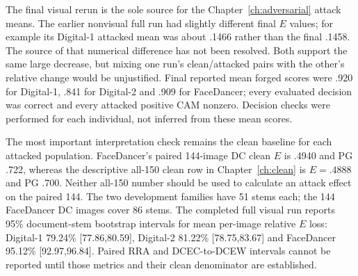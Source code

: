 The final visual rerun is the sole source for the Chapter~\ref{ch:adversarial} attack means. The earlier nonvisual full run had slightly different final $E$ values; for example its Digital-1 attacked mean was about .1466 rather than the final .1458. The source of that numerical difference has not been resolved. Both support the same large decrease, but mixing one run's clean/attacked pairs with the other's relative change would be unjustified. Final reported mean forged scores were .920 for Digital-1, .841 for Digital-2 and .909 for FaceDancer; every evaluated decision was correct and every attacked positive CAM nonzero. Decision checks were performed for each individual, not inferred from these mean scores.

The most important interpretation check remains the clean baseline for each attacked population. FaceDancer's paired 144-image DC clean $E$ is .4940 and PG .722, whereas the descriptive all-150 clean row in Chapter~\ref{ch:clean} is $E=.4888$ and PG .700. Neither all-150 number should be used to calculate an attack effect on the paired 144. The two development families have 51 stems each; the 144 FaceDancer DC images cover 86 stems. The completed full visual run reports 95\% document-stem bootstrap intervals for mean per-image relative $E$ loss: Digital-1 79.24\% [77.86,80.59], Digital-2 81.22\% [78.75,83.67] and FaceDancer 95.12\% [92.97,96.84]. Paired RRA and DCEC-to-DCEW intervals cannot be reported until those metrics and their clean denominator are established.

